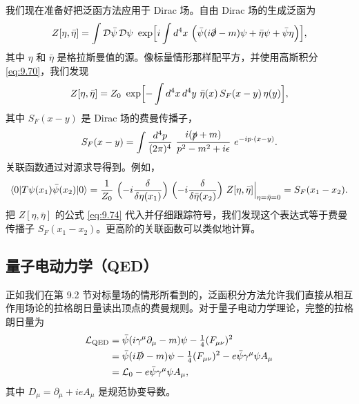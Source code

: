我们现在准备好把泛函方法应用于 Dirac 场。自由 Dirac 场的生成泛函为
\begin{equation}
  Z[\eta, \bar{\eta}] = \int \mathcal{D}\bar{\psi}\,\mathcal{D}\psi\
    \exp\Bigl[ i\int d^4x\ \Bigl( \bar{\psi}(i\slashed{\partial}-m)\psi
      + \bar{\eta}\psi + \bar{\psi}\eta \Bigr) \Bigr] ,
  \label{eq:9.71}
\end{equation}
其中 $\eta$ 和 $\bar{\eta}$ 是格拉斯曼值的源。像标量情形那样配平方，并使用高斯积分 \eqref{eq:9.70}，我们发现
\begin{equation}
  Z[\eta, \bar{\eta}] = Z_0\ \exp\Bigl[ -\int d^4x\,d^4y\
    \bar{\eta}(x)\,S_F(x-y)\,\eta(y) \Bigr] ,
  \label{eq:9.74}
\end{equation}
其中 $S_F(x-y)$ 是 Dirac 场的费曼传播子，
\begin{equation}
  S_F(x-y) = \int \frac{d^4p}{(2\pi)^4}\ \frac{i(\slashed{p}+m)}
    {p^2-m^2+i\epsilon}\ e^{-ip\cdot(x-y)} .
\end{equation}
关联函数通过对源求导得到。例如，
\begin{equation}
  \langle 0|T\psi(x_1)\bar{\psi}(x_2)|0\rangle
  = \frac{1}{Z_0}\ \Bigl( -i\frac{\delta}{\delta\eta(x_1)} \Bigr)\
    \Bigl( -i\frac{\delta}{\delta\bar{\eta}(x_2)} \Bigr)\ Z[\eta,\bar{\eta}]
    \Big|_{\eta=\bar{\eta}=0}
  = S_F(x_1-x_2) .
  \label{eq:9.75}
\end{equation}
把 $Z[\eta,\bar{\eta}]$ 的公式 \eqref{eq:9.74} 代入并仔细跟踪符号，我们发现这个表达式等于费曼传播子 $S_F(x_1-x_2)$。更高阶的关联函数可以类似地计算。

\subsection{量子电动力学（QED）}

正如我们在第 9.2 节对标量场的情形所看到的，泛函积分方法允许我们直接从相互作用场论的拉格朗日量读出顶点的费曼规则。对于量子电动力学理论，完整的拉格朗日量为
\begin{equation}
  \begin{aligned}
    \mathcal{L}_{\mathrm{QED}} &= \bar{\psi}(i\gamma^\mu\partial_\mu-m)\psi
      - \tfrac{1}{4}(F_{\mu\nu})^2\\
    &= \bar{\psi}(i\slashed{D}-m)\psi - \tfrac{1}{4}(F_{\mu\nu})^2
      - e\bar{\psi}\gamma^\mu\psi A_\mu\\
    &= \mathcal{L}_0 - e\bar{\psi}\gamma^\mu\psi A_\mu ,
  \end{aligned}
  \label{eq:9.76}
\end{equation}
其中 $D_\mu = \partial_\mu + ieA_\mu$ 是规范协变导数。

